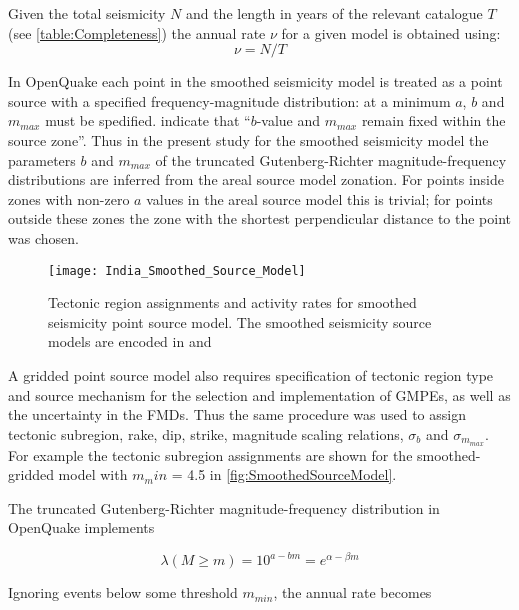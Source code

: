 \documentclass{article}
\begin{document}
Given the total seismicity $N$ and the length in years of the relevant catalogue $T$ (see \autoref{table:Completeness}) the annual rate $\nu$ for a given model is obtained using:
\begin{equation} \label{eq:SeismicityToActivity} 
\nu = N/T 
\end{equation}

In OpenQuake each point in the smoothed seismicity model is treated as a point source with a specified frequency-magnitude distribution: at a minimum $a$, $b$ and $m_{max}$ must be spedified.
\cite{nath2012probabilistic} indicate that ``$b$-value and $m_{max}$ remain fixed within the source zone''.
Thus in the present study for the smoothed seismicity model the parameters $b$ and $m_{max}$ of the truncated Gutenberg-Richter magnitude-frequency distributions are inferred from the areal source model zonation.
For points inside zones with non-zero $a$ values in the areal source model this is trivial; for points outside these zones the zone with the shortest perpendicular distance to the point was chosen.

\begin{figure}[!htb]
\begin{adjustbox}{center}
\texttt{[image: India\_Smoothed\_Source\_Model]}
\end{adjustbox}
\caption[Smoothed seismicity point source model]{Tectonic region assignments and activity rates for smoothed seismicity point source model.
The smoothed seismicity source models are encoded in \texttt{} and \texttt{}}
\label{fig:SmoothedSourceModel}
\end{figure}

A gridded point source model also requires specification of  tectonic region type and source mechanism for the selection and implementation of GMPEs, as well as the uncertainty in the FMDs.
Thus the same procedure was used to assign tectonic subregion, rake, dip, strike, magnitude scaling relations, $\sigma_b$ and $\sigma_{m_{max}}$. For example the tectonic subregion assignments are shown for the smoothed-gridded model with $m_min$ = 4.5 in \autoref{fig:SmoothedSourceModel}.

The truncated Gutenberg-Richter magnitude-frequency distribution in OpenQuake implements

$$ \lambda(M \geq m) = 10^{a - b m} = e^{\alpha - \beta m} $$

Ignoring events below some threshold $m_{min}$, the annual rate becomes
\end{document}
